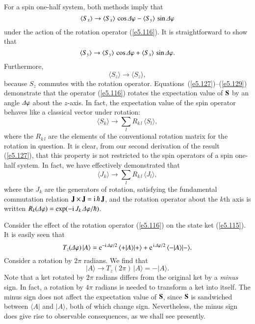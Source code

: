 For a  spin one-half system, both methods imply that
\begin{equation}\label{e5.127}
\langle S_x \rangle \rightarrow \langle S_x\rangle \,\cos{\mit\Delta}\varphi
- \langle S_y\rangle\,\sin{\mit\Delta}\varphi
\end{equation}
under the action of the rotation operator (\ref{e5.116}). It is straightforward to
show that 
\begin{equation}
\langle S_y \rangle \rightarrow \langle S_y\rangle \,\cos{\mit\Delta}\varphi
+ \langle S_x\rangle\,\sin{\mit\Delta}\varphi.
\end{equation}
Furthermore, 
\begin{equation}\label{e5.129}
\langle S_z \rangle \rightarrow\langle S_z\rangle,
\end{equation}
because $S_z$ commutes with the rotation operator. Equations~(\ref{e5.127})--(\ref{e5.129})
 demonstrate that
the operator (\ref{e5.116}) rotates the expectation value of ${\bf S}$ by an
angle ${\mit\Delta} \varphi$ about the $z$-axis. In fact, the expectation value
of the spin operator behaves like a classical  vector under rotation:
\begin{equation}
\langle S_k \rangle \rightarrow \sum_l R_{k\,l}\, \langle S_l\rangle,
\end{equation}
where the $R_{k\,l}$ are the elements of the  conventional rotation matrix 
for the rotation in question. It is clear, from our  second derivation of
the result (\ref{e5.127}), that this property is not restricted to the spin operators of
a spin one-half system. In fact, we have effectively demonstrated that
\begin{equation}
\langle J_k \rangle \rightarrow \sum_l R_{k\,l} \,\langle J_l\rangle,
\end{equation}
where the $J_k$ are the generators of rotation, satisfying the fundamental
commutation relation ${\bf J}\times {\bf J} = {\rm i}\,\hbar\, {\bf J}$,
and the rotation operator about the $k$th axis is written
$R_k ({\mit\Delta}\varphi) = \exp(-{\rm i}\,J_k\, {\mit\Delta}\varphi/\hbar)$. 

Consider the effect of the rotation operator (\ref{e5.116}) on the state ket (\ref{e5.115}).
It is easily seen that
\begin{equation}\label{e5.132}
T_z({\mit\Delta}\varphi)\,|A\rangle = {\rm e}^{-{\rm i}\,{\mit\Delta}\varphi/2}\,
\langle +|A\rangle |+\rangle +  {\rm e}^{\,{\rm i}\,{\mit\Delta}\varphi/2}\,
\langle -|A\rangle |-\rangle.
\end{equation}
Consider a rotation by $2\pi$ radians. We find that
\begin{equation}\label{e5.133}
|A\rangle \rightarrow T_z(2\pi)\,|A\rangle = -|A\rangle.
\end{equation}
Note that a ket rotated by $2\pi$ radians differs from the original ket by a
{\em minus}\/ sign. In fact, a rotation by $4\pi$ radians is needed to transform a ket
into itself. The minus sign does not affect the expectation value of
${\bf S}$, since ${\bf S}$ is sandwiched between $\langle A|$ and $| A\rangle$,
both of which change sign. Nevertheless, the minus sign does give rise to
observable consequences, as we shall see  presently. 

